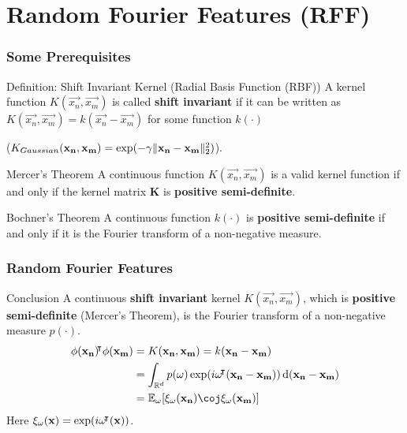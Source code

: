 \documentclass[10pt]{../formats/RU}
\begin{document}
\section{Random Fourier Features (RFF)}
\begin{frame}
\frametitle{Some Prerequisites}
\begin{alertblock}{Definition: Shift Invariant Kernel (Radial Basis Function (RBF))}
  A kernel function $K(\vec{x_n}, \vec{x_m})$ is called \textbf{shift invariant} if it can be written as $K(\vec{x_n}, \vec{x_m}) = k(\vec{x_n}-\vec{x_m})$ for some function $k(\cdot)$

  (\eg $K_{Gaussian}(\mathbf{x_n},\mathbf{x_m})=\exp(-\gamma\lVert\mathbf{x_n}-\mathbf{x_m}\rVert_2^2)$).
\end{alertblock}
\begin{block}{Mercer’s Theorem}
  A continuous function $K(\vec{x_n}, \vec{x_m})$ is a valid kernel function if and only if the kernel matrix $\mathbf{K}$ is \textbf{positive semi-definite}.
\end{block}
\begin{block}{Bochner's Theorem}
  A continuous function $k(\cdot)$ is \textbf{positive semi-definite} if and only if it is the Fourier transform of a non-negative measure.
\end{block}
\end{frame}
\begin{frame}
  \frametitle{Random Fourier Features}
  \begin{exampleblock}{Conclusion}
    A continuous \textbf{shift invariant} kernel $K(\vec{x_n}, \vec{x_m})$, which is \textbf{positive semi-definite} (Mercer's Theorem), is the Fourier transform of a non-negative measure $p(\cdot)$.
    \begin{align}
      \phi(\vec{x_n})\trn\phi(\vec{x_m})
      &= K(\vec{x_n}, \vec{x_m}) = k(\vec{x_n}-\vec{x_m}) \\
      &=\int_{\R^d}p(\vec{\omega})\exp(i\vec{\omega}\trn(\vec{x_n}-\vec{x_m}))\diff(\vec{x_n}-\vec{x_m}) \\
      &= \mathbb{E}_{\vec{\omega}}\bracks*{\xi_{\vec{\omega}}(\vec{x_n})\coj\xi_{\vec{\omega}}(\vec{x_m})}\label{rffinC}
    \end{align}
    Here
    $
    \xi_{\mathbf{\omega}}(\mathbf{x})=\exp(i\mathbf{\omega}{}^{\mkern-4mu\intercal}(\mathbf{x}))
    $.
  \end{exampleblock}
\end{frame}
\end{document}
